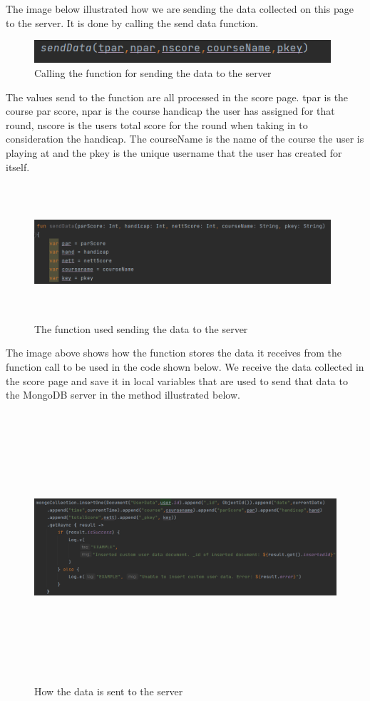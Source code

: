 \newline
The image below illustrated how we are sending the data collected on this page to the server. It is done by calling the send data function.
\begin{figure}[H]
    \centering
    \includegraphics[width=11cm]{img/sendDataFCall.PNG}
    \caption{Calling the function for sending the data to the server}
    \label{fig:altas config}
\end{figure}
The values send to the function are all processed in the score page. tpar is the course par score, npar is the course handicap the user has assigned for that round, nscore is the users total score for the round when taking in to consideration the handicap. The courseName is the name of the course the user is playing at and the pkey is the unique username that the user has created for itself.
\begin{figure}[H]
    \centering
    \includegraphics[width=11cm, height = 5cm]{img/sendDataFunction.PNG}
    \caption{The function used sending the data to the server}
    \label{fig:altas config}
\end{figure}
The image above shows how the function stores the data it receives from the function call to be used in the code shown below. We receive the data collected in the score page and save it in local variables that are used to send that data to the MongoDB server in the method illustrated below.
\begin{figure}[H]
    \centering
    \includegraphics[width=15cm, height = 10cm]{img/sendServer.PNG}
    \caption{How the data is sent to the server}
    \label{fig:altas config}
\end{figure}
